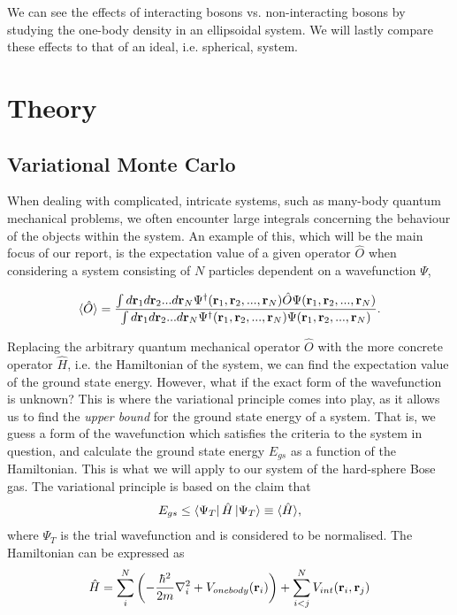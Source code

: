 \documentclass[
    a4paper, aps, twocolumn, floatfix, superscriptaddress,
    nofootinbib]{revtex4-1}
\begin{document}
We can see the effects of interacting bosons vs. non-interacting bosons by studying the one-body density in an ellipsoidal system. We will lastly compare these effects to that of an ideal, i.e. spherical, system.


\section{Theory}\label{sec:Theory}
\subsection{Variational Monte Carlo}
When dealing with complicated, intricate systems, such as many-body quantum mechanical problems, we often encounter large integrals concerning the behaviour of the objects within the system. An example of this, which will be the main focus of our report, is the expectation value of a given operator $\hat{O}$ when considering a system consisting of $N$ particles dependent on a wavefunction $\Psi$,

\begin{equation}\label{eq:1}
    \langle\hat{O}\rangle = \frac{\int d\bold r_1 d\bold r_2 ... d\bold r_N \Psi^\dagger(\bold r_1, \bold r_2, ..., \bold r_N)\hat{O}\Psi(\bold r_1, \bold r_2, ..., \bold r_N)}{\int d\bold r_1 d\bold r_2 ... d\bold r_N \Psi^\dagger(\bold r_1, \bold r_2, ..., \bold r_N)\Psi(\bold r_1, \bold r_2, ..., \bold r_N)}.
\end{equation}

Replacing the arbitrary quantum mechanical operator $\hat{O}$ with the more concrete operator $\hat{H}$, i.e. the Hamiltonian of the system, we can find the expectation value of the ground state energy. However, what if the exact form of the wavefunction is unknown? This is where the variational principle comes into play, as it allows us to find the \textit{upper bound} for the ground state energy of a system. That is, we guess a form of the wavefunction which satisfies the criteria to the system in question, and calculate the ground state energy $E_{gs}$ as a function of the Hamiltonian. This is what we will apply to our system of the hard-sphere Bose gas. The variational principle is based on the claim that
\begin{align}
E_{gs} \leq \bra{\Psi_T}\hat{H}\ket{\Psi_T} \equiv \langle \hat{H} \rangle \label{eq:E_ground_state_var},
\end{align}
where $\Psi_T$ is the trial wavefunction and is considered to be normalised. The Hamiltonian can be expressed as
\begin{align}
    \hat{H} = \sum_i^N\left(-\frac{\hbar^2}{2m}\nabla_i^2 + V_{onebody}(\bold{r}_i)\right) + \sum_{i<j}^N V_{int}(\bold{r}_i, \bold{r}_j) \label{eq:Hamiltonian}
\end{align}
\end{document}
